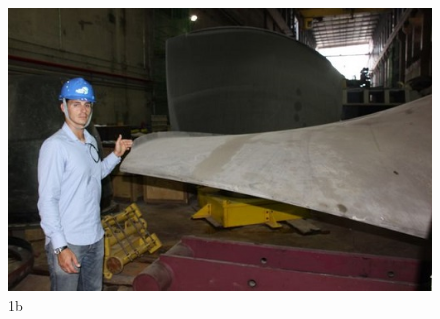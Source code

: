 \begin{figure}[h!]
  \centering
  \includegraphics[width=1\linewidth]{Fotos/Novembro2013/6.jpg}
  \caption{1b}
  \label{nov20136}
\end{figure}